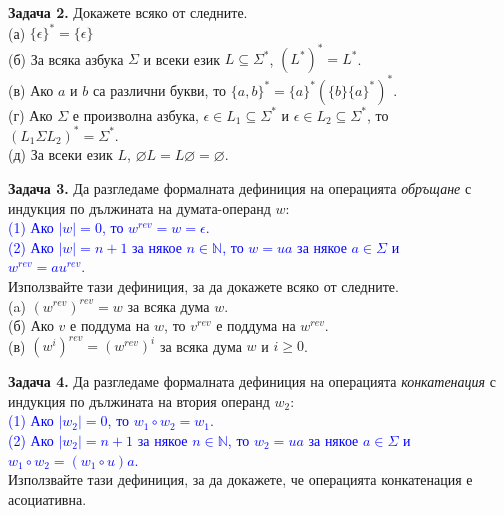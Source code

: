 \documentclass[openany]{book}
\begin{document}
    \vspace{15pt}

    \textbf{Задача 2.} Докажете всяко от следните. \\
    (а) $\{\epsilon\}^* = \{\epsilon\}$ \\ 
    (б) За всяка азбука $\Sigma$ и всеки език $L \subseteq \Sigma^*$, $(L^*)^* = L^*$. \\
    (в) Ако $a$ и $b$ са различни букви, то $\{a,b\}^* = \{a\}^*(\{b\}\{a\}^*)^*$. \\
    (г) Ако $\Sigma$ е произволна азбука, $\epsilon \in L_1 \subseteq \Sigma^*$ и $\epsilon \in L_2 \subseteq \Sigma^*$, то \\
    $(L_1 \Sigma L_2)^* = \Sigma^*$. \\
    (д) За всеки език $L$, $\varnothing L = L \varnothing = \varnothing$.

    \vspace{15pt}

    \textbf{Задача 3.} Да разгледаме формалната дефиниция на операцията \textit{обръщане} с индукция по дължината на думата-операнд $w$: \\
    \textcolor{blue}{(1) Ако $|w| = 0$, то $w^{rev} = w = \epsilon$.} \\
    \textcolor{blue}{(2) Ако $|w| = n + 1$ за някое $n \in \mathbb{N}$, то $w = ua$ за някое $a \in \Sigma$ и \\ $w^{rev} = au^{rev}$.} \\
    \vspace{5pt}
    Използвайте тази дефиниция, за да докажете всяко от следните. \\
    (a) $(w^{rev})^{rev} = w$ за всяка дума $w$. \\
    (б) Ако $v$ е поддума на $w$, то $v^{rev}$ е поддума на $w^{rev}$. \\
    (в) $(w^i)^{rev} = (w^{rev})^i$ за всяка дума $w$ и $i \geq 0$.

    \vspace{15pt}

    \textbf{Задача 4.} Да разгледаме формалната дефиниция на операцията \textit{конкатенация}
    с индукция по дължината на втория операнд $w_2$: \\
    \textcolor{blue}{(1) Ако $|w_2| = 0$, то $w_1 \circ w_2 = w_1$.} \\
    \textcolor{blue}{(2) Ако $|w_2| = n + 1$ за някое $n \in \mathbb{N}$, то $w_2 = ua$ за някое $a \in \Sigma$ и \\ $w_1 \circ w_2 = (w_1 \circ u)a$.} \\ 
    \vspace{5pt}
    Използвайте тази дефиниция, за да докажете, че операцията конкатенация е асоциативна.
\end{document}
